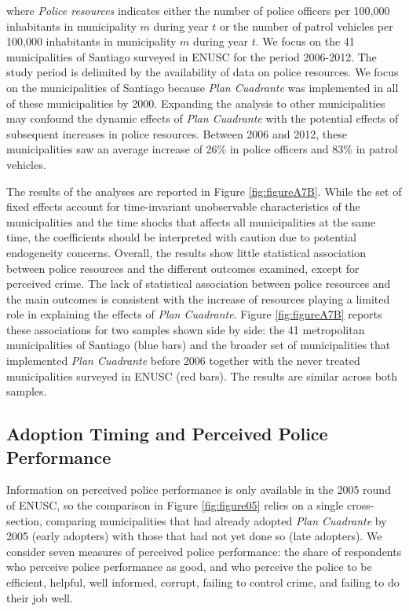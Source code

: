 \noindent where \textit{Police resources} indicates either the number of police officers per 100,000 inhabitants in municipality $m$ during year $t$ or the number of patrol vehicles per 100,000 inhabitants in municipality $m$ during year $t$. We focus on the 41 municipalities of Santiago surveyed in ENUSC for the period 2006-2012. The study period is delimited by the availability of data on police resources. We focus on the municipalities of Santiago because \emph{Plan Cuadrante} was implemented in all of these municipalities by 2000. Expanding the analysis to other municipalities may confound the dynamic effects of \emph{Plan Cuadrante} with the potential effects of subsequent increases in police resources. Between 2006 and 2012, these municipalities saw an average increase of 26\% in police officers and 83\% in patrol vehicles.

The results of the analyses are reported in Figure \ref{fig:figureA7B}. While the set of fixed effects account for time-invariant unobservable characteristics of the municipalities and the time shocks that affects all municipalities at the same time, the coefficients should be interpreted with caution due to potential endogeneity concerns. Overall, the results show little statistical association between police resources and the different outcomes examined, except for perceived crime. The lack of statistical association between police resources and the main outcomes is consistent with the increase of resources playing a limited role in explaining the effects of \emph{Plan Cuadrante}. Figure \ref{fig:figureA7B} reports these associations for two samples shown side by side: the 41 metropolitan municipalities of Santiago (blue bars) and the broader set of municipalities that implemented \emph{Plan Cuadrante} before 2006 together with the never treated municipalities surveyed in ENUSC (red bars). The results are similar across both samples.


\clearpage

\FloatBarrier

\FloatBarrier
\clearpage

\subsection{Adoption Timing and Perceived Police Performance}
\label{sec:balance_doseresponse}

Information on perceived police performance is only available in the 2005 round of ENUSC, so the comparison in Figure \ref{fig:figure05} relies on a single cross-section, comparing municipalities that had already adopted \emph{Plan Cuadrante} by 2005 (early adopters) with those that had not yet done so (late adopters). We consider seven measures of perceived police performance: the share of respondents who perceive police performance as good, and who perceive the police to be efficient, helpful, well informed, corrupt, failing to control crime, and failing to do their job well.



